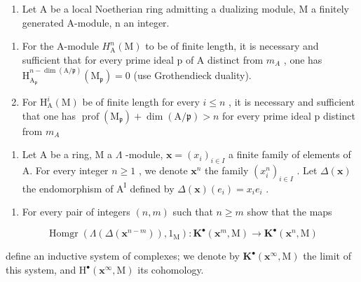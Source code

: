 \begin{enumerate}
\def\labelenumi{\arabic{enumi})}
\setcounter{enumi}{5}
\tightlist
\item
  Let A be a local Noetherian ring admitting a dualizing module, M a finitely generated A-module, n an integer.
\end{enumerate}

\begin{enumerate}
\def\labelenumi{\alph{enumi})}
\item
  For the A-module \(H_{\mathrm{A}}^{n}(\mathrm{M})\) to be of finite length, it is necessary and sufficient that for every prime ideal p of A distinct from \(m_{A}\) , one has \(\mathrm{H}_{\mathrm{A}_{\mathfrak{p}}}^{n-\dim(\mathrm{A}/\mathfrak{p})}(\mathrm{M}_{\mathfrak{p}})=0\) (use Grothendieck duality).
\item
  For \(\mathrm{H}_{\mathrm{A}}^{i}(\mathrm{M})\) be of finite length for every \(i \leqslant n\) , it is necessary and sufficient that one has \(\operatorname{prof}(\mathrm{M}_{\mathfrak{p}}) + \dim(\mathrm{A}/\mathfrak{p}) > n\) for every prime ideal p distinct from \(m_{A}\)
\end{enumerate}

\begin{enumerate}
\def\labelenumi{\arabic{enumi})}
\setcounter{enumi}{6}
\tightlist
\item
  Let A be a ring, M a \(\Lambda\) -module, \(\mathbf{x} = (x_i)_{i \in I}\) a finite family of elements of A. For every integer \(n \geqslant 1\) , we denote \(\mathbf{x}^n\) the family \((x_i^n)_{i \in I}\) . Let \(\Delta(\mathbf{x})\) the endomorphism of \(\mathrm{A}^{\mathrm{I}}\) defined by \(\Delta(\mathbf{x})(e_i) = x_i e_i\) .
\end{enumerate}

\begin{enumerate}
\def\labelenumi{\alph{enumi})}
\tightlist
\item
  For every pair of integers \((n, m)\) such that \(n \geqslant m\) show that the maps
\end{enumerate}

\[
\operatorname{Homgr} \left(\Lambda \left(\Delta \left(\mathbf {x} ^ {n - m}\right)\right), 1 _ {\mathrm{M}}\right): \mathbf {K} ^ {\bullet} \left(\mathbf {x} ^ {m}, \mathrm{M}\right) \longrightarrow \mathbf {K} ^ {\bullet} \left(\mathbf {x} ^ {n}, \mathrm{M}\right)
\]

define an inductive system of complexes; we denote by \(\mathbf{K}^{\bullet}(\mathbf{x}^{\infty},\mathrm{M})\) the limit of this system, and \(\mathrm{H}^{\bullet}(\mathbf{x}^{\infty},\mathrm{M})\) its cohomology.


